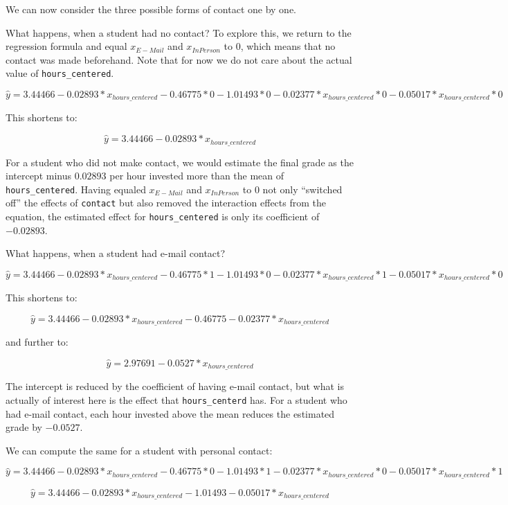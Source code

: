 \documentclass[
]{book}
\begin{document}
We can now consider the three possible forms of contact one by one.

What happens, when a student had no contact? To explore this, we return to the
regression formula and equal \(x_{E-Mail}\) and \(x_{In Person}\) to \(0\), which
means that no contact was made beforehand. Note that for now we do not care
about the actual value of \texttt{hours\_centered}.

\[\hat{y} = 3.44466 -0.02893 *x_{hours\_centered} -0.46775 * 0 
-1.01493 * 0 
-0.02377 * x_{hours\_centered} * 0 
-0.05017 * x_{hours\_centered} * 0\]

This shortens to:

\[\hat{y} = 3.44466 -0.02893 *x_{hours\_centered}\]

For a student who did not make contact, we would estimate the final grade as the
intercept minus \(0.02893\) per hour invested more than the mean of
\texttt{hours\_centered}. Having equaled \(x_{E-Mail}\) and \(x_{In Person}\) to \(0\) not
only ``switched off'' the effects of \texttt{contact} but also removed the interaction
effects from the equation, the estimated effect for \texttt{hours\_centered} is only its
coefficient of \(-0.02893\).

What happens, when a student had e-mail contact?

\[\hat{y} = 3.44466 -0.02893 * x_{hours\_centered} -0.46775 * 1 
-1.01493 * 0 
-0.02377 * x_{hours\_centered} * 1 
-0.05017 * x_{hours\_centered} * 0\]

This shortens to:

\[\hat{y} = 3.44466 -0.02893 *x_{hours\_centered} -0.46775 -0.02377 * x_{hours\_centered}\]

and further to:

\[\hat{y} = 2.97691 -0.0527 *x_{hours\_centered}\]

The intercept is reduced by the coefficient of having e-mail contact, but what
is actually of interest here is the effect that \texttt{hours\_centerd} has. For a
student who had e-mail contact, each hour invested above the mean reduces the
estimated grade by \(-0.0527\).

We can compute the same for a student with personal contact:

\[\hat{y} = 3.44466 -0.02893 * x_{hours\_centered} -0.46775 * 0
-1.01493 * 1 
-0.02377 * x_{hours\_centered} * 0 
-0.05017 * x_{hours\_centered} * 1\]

\[\hat{y} = 3.44466 -0.02893 *x_{hours\_centered} -1.01493 -0.05017 * x_{hours\_centered}\]
\end{document}
